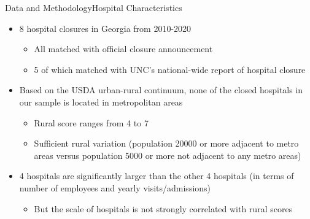 \documentclass{beamer}
\theoremstyle{definition}
\begin{document}
\begin{frame}{Data and Methodology}{Hospital Characteristics}
\begin{itemize}
\setlength{\itemsep}{18pt}
    \item 8 hospital closures in Georgia from 2010-2020
    \begin{itemize}
    \setlength{\itemsep}{7pt}
    \setlength{\itemsep}{7pt}
        \item All matched with official closure announcement
        \item 5 of which matched with UNC's national-wide report of hospital closure
    \end{itemize}
    \item Based on the USDA urban-rural continuum, none of the closed hospitals in our sample is located in metropolitan areas
    \begin{itemize}
    \setlength{\itemsep}{7pt}
        \item Rural score ranges from 4 to 7
        \item Sufficient rural variation (population 20000 or more adjacent to metro areas versus population 5000 or more not adjacent to any metro areas)
    \end{itemize}
    \item 4 hospitals are significantly larger than the other 4 hospitals (in terms of number of employees and yearly visits/admissions)
    \begin{itemize}
    \setlength{\itemsep}{7pt}
        \item But the scale of hospitals is not strongly correlated with rural scores %
    \end{itemize}
\end{itemize}
\end{frame}
\end{document}
